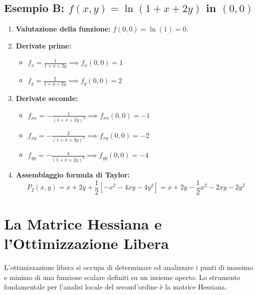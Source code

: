 \subsection{Esempio B:  $f(x,y) = \ln(1 + x + 2y)$ in $(0,0)$}
\begin{enumerate}
    \item \textbf{Valutazione della funzione:} $f(0,0) = \ln(1) = 0$.
    \item \textbf{Derivate prime:} 
    \begin{itemize}
        \item $f_x = \frac{1}{1+x+2y} \implies f_x(0,0) = 1$
        \item $f_y = \frac{2}{1+x+2y} \implies f_y(0,0) = 2$
    \end{itemize}
    \item \textbf{Derivate seconde:}
    \begin{itemize}
        \item $f_{xx} = -\frac{1}{(1+x+2y)^2} \implies f_{xx}(0,0) = -1$
        \item $f_{xy} = -\frac{2}{(1+x+2y)^2} \implies f_{xy}(0,0) = -2$
        \item $f_{yy} = -\frac{4}{(1+x+2y)^2} \implies f_{yy}(0,0) = -4$
    \end{itemize}
    \item \textbf{Assemblaggio formula di Taylor:}
    \[ P_2(x,y) = x + 2y + \frac{1}{2}\left[-x^2 - 4xy - 4y^2\right] = x + 2y - \frac{1}{2}x^2 - 2xy - 2y^2 \]
\end{enumerate}

\section{La Matrice Hessiana e l'Ottimizzazione Libera}

L'ottimizzazione libera si occupa di determinare ed analizzare i punti di massimo e minimo di una funzione scalare definiti su un insieme aperto. Lo strumento fondamentale per l'analisi locale del second'ordine è la matrice Hessiana.

